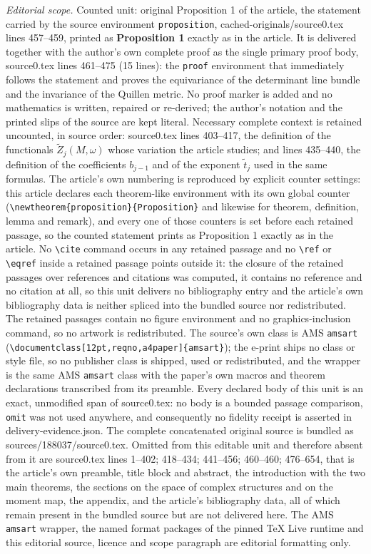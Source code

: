 \documentclass[10pt,a4paper]{amsart}
\theoremstyle{definition}
\theoremstyle{remark}
\begin{document}
\noindent\textit{Editorial scope.} Counted unit: original Proposition 1 of the article, the statement carried by the source environment \texttt{proposition}, cached-originals/source0.tex lines 457--459, printed as \textbf{Proposition 1} exactly as in the article. It is delivered together with the author's own complete proof as the single primary proof body, source0.tex lines 461--475 (15 lines): the \texttt{proof} environment that immediately follows the statement and proves the equivariance of the determinant line bundle and the invariance of the Quillen metric. No proof marker is added and no mathematics is written, repaired or re-derived; the author's notation and the printed slips of the source are kept literal. Necessary complete context is retained uncounted, in source order: source0.tex lines 403--417, the definition of the functionals $\widetilde{Z}_j(M,\omega)$ whose variation the article studies; and lines 435--440, the definition of the coefficients $b_{j-1}$ and of the exponent $\widetilde{t}_j$ used in the same formulas. The article's own numbering is reproduced by explicit counter settings: this article declares each theorem-like environment with its own global counter (\texttt{\textbackslash newtheorem\{proposition\}\{Proposition\}} and likewise for theorem, definition, lemma and remark), and every one of those counters is set before each retained passage, so the counted statement prints as Proposition 1 exactly as in the article. No \texttt{\textbackslash cite} command occurs in any retained passage and no \texttt{\textbackslash ref} or \texttt{\textbackslash eqref} inside a retained passage points outside it: the closure of the retained passages over references and citations was computed, it contains no reference and no citation at all, so this unit delivers no bibliography entry and the article's own bibliography data is neither spliced into the bundled source nor redistributed. The retained passages contain no figure environment and no graphics-inclusion command, so no artwork is redistributed. The source's own class is AMS \texttt{amsart} (\texttt{\textbackslash documentclass[12pt,reqno,a4paper]\{amsart\}}); the e-print ships no class or style file, so no publisher class is shipped, used or redistributed, and the wrapper is the same AMS \texttt{amsart} class with the paper's own macros and theorem declarations transcribed from its preamble. Every declared body of this unit is an exact, unmodified span of source0.tex: no body is a bounded passage comparison, \texttt{omit} was not used anywhere, and consequently no fidelity receipt is asserted in delivery-evidence.json. The complete concatenated original source is bundled as sources/188037/source0.tex. Omitted from this editable unit and therefore absent from it are source0.tex lines 1--402; 418--434; 441--456; 460--460; 476--654, that is the article's own preamble, title block and abstract, the introduction with the two main theorems, the sections on the space of complex structures and on the moment map, the appendix, and the article's bibliography data, all of which remain present in the bundled source but are not delivered here. The AMS \texttt{amsart} wrapper, the named format packages of the pinned TeX Live runtime and this editorial source, licence and scope paragraph are editorial formatting only.\par\smallskip
\end{document}
